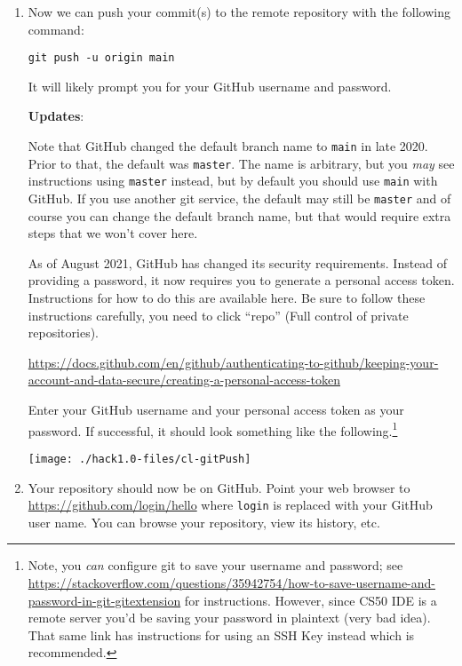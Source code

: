 \documentclass[12pt]{scrartcl}
\begin{document}
\begin{enumerate}
  \item Now we can push your commit(s) to the remote repository
  with the following command:
  
  \texttt{git push -u origin main}
  
  It will likely prompt you for your GitHub username and password.

  \textbf{Updates}: 
  
  Note that GitHub changed the default branch name to \texttt{main}
  in late 2020.  Prior to that, the default was \texttt{master}.  
  The name is arbitrary, but you \emph{may} see instructions using 
  \texttt{master} instead, but by default you should use 
  \texttt{main} with GitHub.  If you use another git service, 
  the default may still be \texttt{master} and of course you can
  change the default branch name, but that would require extra steps
  that we won't cover here.
  
  As of August 2021, GitHub has changed its security
  requirements.  Instead of providing a password, it now requires you
  to generate a personal access token.  Instructions for how to do this
  are available here.  Be sure to follow these instructions carefully,
  you need to click ``repo'' (Full control of private repositories).
  
  \url{https://docs.github.com/en/github/authenticating-to-github/keeping-your-account-and-data-secure/creating-a-personal-access-token}
  
  Enter your GitHub username and your personal access token as your
  password.  If successful, it should look something like
  the following.\footnote{Note, you \emph{can} configure git 
  to save your username and password; see \url{https://stackoverflow.com/questions/35942754/how-to-save-username-and-password-in-git-gitextension} for
  instructions.  However, since CS50 IDE is a remote server you'd
  be saving your password in plaintext (very bad idea).  That same
  link has instructions for using an SSH Key instead which is
  recommended.}
  
  \begin{center}
  \texttt{[image: ./hack1.0-files/cl-gitPush]}
  \end{center}

  \item Your repository should now be on GitHub.
  Point your web browser to \url{https://github.com/login/hello}
  where \texttt{login} is replaced with your GitHub user
  name.  You can browse your repository, view its history, etc.
  
\end{enumerate}
\end{document}
